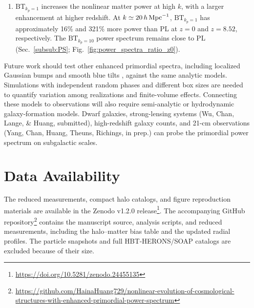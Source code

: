 \documentclass[
 reprint,
 superscriptaddress,
 nofootinbib,
 nobibnotes,
 amsmath,
 amssymb,
 aps,
 prd,
 floatfix,
 longbibliography
]{revtex4-2}
\DeclareRobustCommand{\change}[1]{#1}
\DeclareRobustCommand{\BTKPone}{\ensuremath{\mathrm{BT}_{k_p=1}}}
\DeclareRobustCommand{\BTKPten}{\ensuremath{\mathrm{BT}_{k_p=10}}}
\begin{document}
\begin{enumerate}
    For the \(0.25\)-dex mass bins lying wholly above \(M_{200c}=1.89\times10^9\,M_\odot\) and containing at least 20 halos, the Diemer \& Joyce (2019) concentration-mass relation agrees with the simulation medians within \(20\%\) for PL, \BTKPone{}, and \BTKPten{} at all four redshifts (Sec.~\ref{subsub:concentration}) \citep{Diemer2019}.


    \item \change{\BTKPone{} increases the nonlinear matter power at high \(k\), with a larger enhancement at higher redshift. At \(k\simeq20\,h\,{\rm Mpc}^{-1}\), \BTKPone{} has approximately 16\% and 321\% more power than PL at \(z=0\) and \(z=8.52\), respectively. The \BTKPten{} power spectrum remains close to PL (Sec.~\ref{subsub:PS}; Fig.~\ref{fig:power_spectra_ratio_z0}).}
\end{enumerate}


Future work should test other enhanced primordial spectra, including localized Gaussian bumps \citep{Tkac24BumpyPPS} and smooth blue tilts \citep{2026arXiv260522161K}, against the same analytic models. Simulations with independent random phases and different box sizes are needed to quantify variation among realizations and finite-volume effects. Connecting these models to observations will also require semi-analytic or hydrodynamic galaxy-formation models. Dwarf galaxies, strong-lensing systems (Wu, Chan, Lange, \& Huang, submitted), high-redshift galaxy counts, and 21-cm observations (Yang, Chan, Huang, Theuns, Richings, in prep.) can probe the primordial power spectrum on subgalactic scales.

\section*{Data Availability}


\change{The reduced measurements, compact halo catalogs, and figure reproduction materials are available in the Zenodo v1.2.0 release\footnote{\url{https://doi.org/10.5281/zenodo.24455135}}. The accompanying GitHub repository\footnote{\url{https://github.com/HainaHuang729/nonlinear-evolution-of-cosmological-structures-with-enhanced-primordial-power-spectrum}} contains the manuscript source, analysis scripts, and reduced measurements, including the halo--matter bias table and the updated radial profiles. The particle snapshots and full \textsc{HBT-HERONS}/\textsc{SOAP} catalogs are excluded because of their size.}
\end{document}
